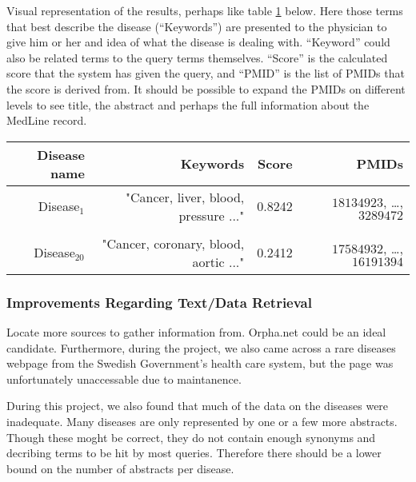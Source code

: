 Visual representation of the results, perhaps like table
\ref{FutureGUI} below. Here those terms that best
describe the disease (``Keywords'') are presented to the physician to give him or her
and idea of what the disease is dealing with. ``Keyword'' could also be related terms
to the query terms themselves. ``Score'' is the calculated score that the system has given the
query, and ``PMID'' is the list of PMIDs that the score is derived
from. It should be possible to expand the PMIDs on different levels to
see title, the abstract and perhaps the full information about the MedLine
record.
\begin{table}
\begin{tiny}
  \begin{tabular}{|r|r|r|r|}
    \hline
    Disease name & Keywords & Score & PMIDs \\
    \hline
    Disease$_1$ & "Cancer, liver, blood, pressure ..." & 0.8242 & $18134923$, \dots, $3289472$ \\
    \hline
    {} & {} & {} & {} \\
    \hline
    Disease$_20$ & "Cancer, coronary, blood, aortic ..." & 0.2412 & $17584932$, \dots, $16191394$ \\
    \hline
  \end{tabular}
  \end{tiny}
  \label{FutureGUI}
\end{table}

\subsubsection{Improvements Regarding Text/Data Retrieval}
Locate more sources to gather information from. Orpha.net could be an ideal candidate. Furthermore,
during the project, we also came across a rare diseases webpage from the Swedish 
Government's health care system, but the page was unfortunately unaccessable due to maintanence.

During this project, we also found that much of the data on the diseases were inadequate. Many diseases are only represented
by one or a few more abstracts. Though these moght be correct, they do not contain enough synonyms and decribing terms to
be hit by most queries. Therefore there should be a lower bound on the number of abstracts per disease.
